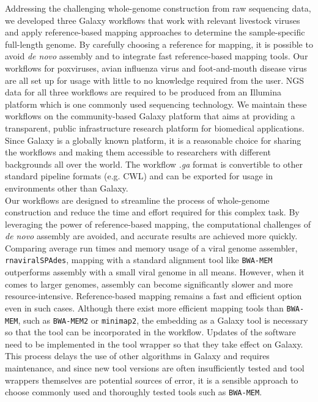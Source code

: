 Addressing the challenging whole-genome construction from raw sequencing data, we developed three Galaxy workflows that work with relevant livestock viruses and apply reference-based mapping approaches to determine the sample-specific full-length genome. By carefully choosing a reference for mapping, it is possible to avoid \textit{de novo} assembly and to integrate fast reference-based mapping tools. Our workflows for poxviruses, avian influenza virus and foot-and-mouth disease virus are all set up for usage with little to no knowledge required from the user. \ac{NGS} data for all three workflows are required to be produced from an Illumina platform which is one commonly used sequencing technology. We maintain these workflows on the community-based Galaxy platform that aims at providing a transparent, public infrastructure research platform for biomedical applications. Since Galaxy is a globally known platform, it is a reasonable choice for sharing the workflows and making them accessible to researchers with different backgrounds all over the world. The workflow \textit{.ga} format is convertible to other standard pipeline formats (e.g. \ac{CWL}) and can be exported for usage in environments other than Galaxy.\\
Our workflows are designed to streamline the process of whole-genome construction and reduce the time and effort required for this complex task. By leveraging the power of reference-based mapping, the computational challenges of \textit{de novo} assembly are avoided, and accurate results are achieved more quickly. Comparing average run times and memory usage of a viral genome assembler, \texttt{rnaviralSPAdes}, mapping with a standard alignment tool like \texttt{BWA-MEM} outperforms assembly with a small viral genome in all means. However, when it comes to larger genomes, assembly can become significantly slower and more resource-intensive. Reference-based mapping remains a fast and efficient option even in such cases. Although there exist more efficient mapping tools than \texttt{BWA-MEM}, such as \texttt{BWA-MEM2} or \texttt{minimap2}, the embedding as a Galaxy tool is necessary so that the tool can be incorporated in the workflow. Updates of the software need to be implemented in the tool wrapper so that they take effect on Galaxy. This process delays the use of other algorithms in Galaxy and requires maintenance, and since new tool versions are often insufficiently tested and tool wrappers themselves are potential sources of error, it is a sensible approach to choose commonly used and thoroughly tested tools such as \texttt{BWA-MEM}.\\
